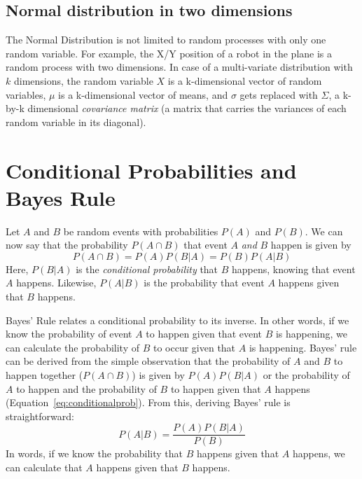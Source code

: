 \subsection{Normal distribution in two dimensions}
The Normal Distribution is not limited to random processes with only one random variable. For example, the X/Y position of a robot in the plane is a random process with two dimensions. In case of a multi-variate distribution with $k$ dimensions, the random variable $ X$ is a k-dimensional vector of random variables, $ \mu$ is a k-dimensional vector of means, and $ \sigma$ gets replaced with $ \Sigma$,  a k-by-k dimensional \emph{covariance matrix} (a matrix that carries the variances of each random variable in its diagonal).

\section{Conditional Probabilities and Bayes Rule}\label{sec:bayesrule}
Let $A$ and $B$ be random events with probabilities $P(A)$ and $P(B)$. We can now say that the probability $P(A \cap B)$ that event $A$ \emph{and} $B$ happen is given by
\begin{equation}\label{eq:conditionalprob}
P(A \cap B)=P(A)P(B|A)=P(B)P(A|B)
\end{equation}
Here, $P(B|A)$ is the \emph{conditional probability} that $B$ happens, knowing that event $A$ happens. Likewise, $P(A|B)$ is the probability that event $A$ happens given that $B$ happens.

Bayes' Rule relates a conditional probability to its inverse. In other words, if we know the probability of event $A$ to happen given that event $B$ is happening, we can calculate the probability of $B$ to occur given that $A$ is happening. Bayes' rule can be derived from the simple observation that the probability of $A$ and $B$ to happen together ($P(A \cap B)$) is given by $P(A)P(B|A)$ or the probability of $A$ to happen and the probability of $B$ to happen given that $A$ happens (Equation~\ref{eq:conditionalprob}).
From this, deriving Bayes' rule is straightforward:
\begin{equation}
P(A|B)=\frac{P(A)P(B|A)}{P(B)}
\end{equation}
In words, if we know the probability that $B$ happens given that $A$ happens, we can calculate that $A$ happens given that $B$ happens.

